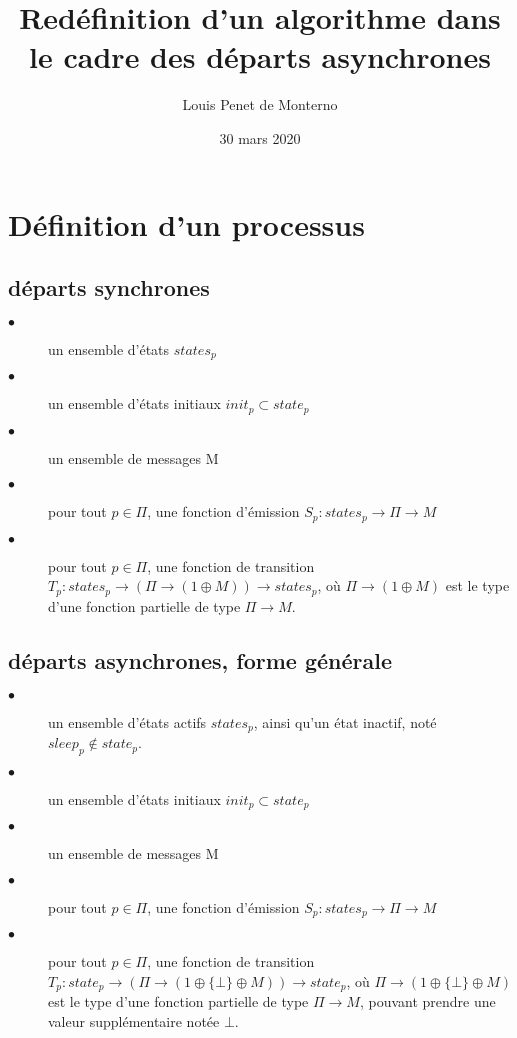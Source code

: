 \documentclass{article}
\title{Redéfinition d'un algorithme dans le cadre des départs asynchrones}
\date{30 mars 2020}
\author{Louis Penet de Monterno}
\begin{document}
  \maketitle


  \section{Définition d'un processus}

  \subsection{départs synchrones}

  \begin{description}

	  \item[$\bullet$] un ensemble d'états $states_p$
	  \item[$\bullet$] un ensemble d'états initiaux  $init_p \subset state_p$
	  \item[$\bullet$] un ensemble de messages M
	  \item[$\bullet$] pour tout $p \in \Pi$, une fonction d'émission
		  $S_p : states_p \rightarrow \Pi \rightarrow M$
	  \item[$\bullet$] pour tout $p \in \Pi$, une fonction de transition
		  $T_p : states_p \rightarrow (\Pi \rightarrow (1 \oplus M)) \rightarrow states_p$,
		  où $\Pi \rightarrow (1 \oplus M)$ est le type d'une fonction partielle
		  de type $\Pi \rightarrow M$.

  \end{description}


  \subsection{départs asynchrones, forme générale}

  \begin{description}

	  \item[$\bullet$] un ensemble d'états actifs
		  $states_p$, ainsi qu'un état inactif, noté $sleep_p \notin state_p$.
	  \item[$\bullet$] un ensemble d'états initiaux  $init_p \subset state_p$
	  \item[$\bullet$] un ensemble de messages M
	  \item[$\bullet$] pour tout $p \in \Pi$, une fonction d'émission
		  $S_p : states_p \rightarrow \Pi \rightarrow M$
	  \item[$\bullet$] pour tout $p \in \Pi$, une fonction de transition
		  $T_p : state_p \rightarrow (\Pi \rightarrow (1 \oplus \{ \bot \} \oplus M))
		  \rightarrow state_p$,
		  où $\Pi \rightarrow (1 \oplus \{ \bot \} \oplus M)$ est le type d'une fonction partielle
		  de type $\Pi \rightarrow M$, pouvant prendre une valeur supplémentaire notée $\bot$.

  \end{description}
\end{document}
